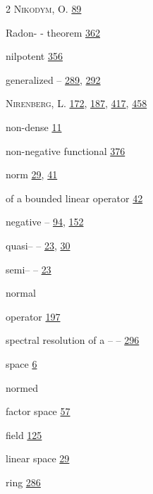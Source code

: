 \begin{multicols}{2}
\noindent \textsc{Nikodym}, O. \hyperlink{page.89}{89}\par
\hspace*{1.1em}Radon- - theorem \hyperlink{page.362}{362}\par
\noindent nilpotent \hyperlink{page.356}{356}\par
\hspace*{1.1em}generalized -- \hyperlink{page.289}{289}, \hyperlink{page.292}{292}\par
\noindent \textsc{Nirenberg}, L. \hyperlink{page.172}{172}, \hyperlink{page.187}{187}, \hyperlink{page.417}{417}, \hyperlink{page.458}{458}\par
\noindent non-dense \hyperlink{page.11}{11}\par
\noindent non-negative functional \hyperlink{page.376}{376}\par
\noindent norm \hyperlink{page.29}{29}, \hyperlink{page.41}{41}\par
\hspace*{1.1em}of a bounded linear operator \hyperlink{page.42}{42}\par
\hspace*{1.1em}negative -- \hyperlink{page.94}{94}, \hyperlink{page.152}{152}\par
\hspace*{1.1em}quasi-- -- \hyperlink{page.23}{23}, \hyperlink{page.30}{30}\par
\hspace*{1.1em}semi-- -- \hyperlink{page.23}{23}\par
\noindent normal\par
\hspace*{1.1em}operator \hyperlink{page.197}{197}\par
\hspace*{2.2em}spectral resolution of a -- -- \hyperlink{page.296}{296}\par
\hspace*{1.1em}space \hyperlink{page.6}{6}\par
\noindent normed\par
\hspace*{1.1em}factor space \hyperlink{page.57}{57}\par
\hspace*{1.1em}field \hyperlink{page.125}{125}\par
\hspace*{1.1em}linear space \hyperlink{page.29}{29}\par
\hspace*{1.1em}ring \hyperlink{page.286}{286}\par

\end{multicols}
